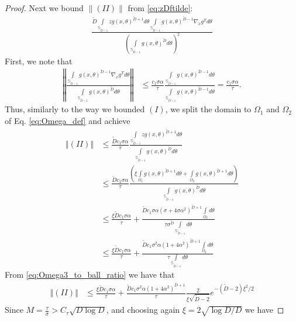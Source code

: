 \documentclass[12pt]{article}
\theoremstyle{remark}
\newcommand{\norm}[1]{\left\Vert #1 \right\Vert}
\newcommand{\wtilde}[1]{\widetilde{#1}}
\begin{document}
\begin{appendices}
\begin{proof}
Next we bound $\|(II)\|$ from \eqref{eq:zDftilde}:
\begin{align*}
\frac{\wtilde D\int\limits_{\mathbb{S}_{\wtilde D-1}}z g(x,\theta)^{\wtilde D+1} d\theta \int\limits_{\mathbb{S}_{\wtilde D-1}} g(x,\theta)^{\wtilde D-1}\nabla_x g^T d\theta}
{\left(\int\limits_{\mathbb{S}_{\wtilde D-1}}g(x,\theta)^{\wtilde D} d\theta\right)^2}
\end{align*}
First, we note that 
\begin{align*}
\norm{\frac{\int\limits_{\mathbb{S}_{\wtilde D-1}} g(x,\theta)^{\wtilde D-1}\nabla_x g^T d\theta}
{\int\limits_{\mathbb{S}_{\wtilde D-1}}g(x,\theta)^{\wtilde D} d\theta}} & \leq \frac{c_1 \sigma\alpha}{\tau} \frac{\int\limits_{\mathbb{S}_{\wtilde D-1}} g(x,\theta)^{\wtilde D-1} d\theta}
{\int\limits_{\mathbb{S}_{\wtilde D-1}}g(x,\theta)^{\wtilde D-1} d\theta} = \frac{c_1 \sigma \alpha}{\tau}.
\end{align*}
Thus, similarly to the way we bounded $(I)$, we split the domain to $\Omega_1$ and $\Omega_2$ of Eq. \eqref{eq:Omega_def} and achieve
\begin{align*}
\norm{(II)} &\leq \frac{\wtilde Dc_1 \sigma\alpha}{\tau}\frac{\int\limits_{\mathbb{S}_{\wtilde D-1}}z g(x,\theta)^{\wtilde D+1} d\theta}
{\int\limits_{\mathbb{S}_{\wtilde D-1}}g(x,\theta)^{\wtilde D} d\theta}
\\
&\leq \frac{\wtilde Dc_1 \sigma\alpha}{\tau} \frac{ \left(\xi\int\limits_{\Omega_1} g(x,\theta)^{\wtilde D+1}  d\theta + \int\limits_{\Omega_2} g(x,\theta)^{\wtilde D+1}  d\theta \right)}
{\int\limits_{\mathbb{S}_{\wtilde D-1}}g(x,\theta)^{\wtilde D} d\theta}
\\
&\leq  \frac{\xi\wtilde Dc_1 \sigma\alpha}{\tau} + \frac{\wtilde Dc_1 \sigma\alpha ( \sigma + 4\sigma \alpha^2)^{\wtilde D+1}\int\limits_{\Omega_2}  d\theta }
{\tau \sigma^{\wtilde D}\int\limits_{\mathbb{S}_{\wtilde D-1}} d\theta}
\\
&\leq  \frac{\xi\wtilde Dc_1 \sigma\alpha}{\tau} + \frac{\wtilde Dc_1 \sigma^2\alpha ( 1 + 4\alpha^2)^{\wtilde D+1}\int\limits_{\Omega_2}  d\theta }
{\tau \int\limits_{\mathbb{S}_{\wtilde D-1}} d\theta}
\end{align*}
From \eqref{eq:Omega3_to_ball_ratio} we have that 
\begin{align*}
\norm{(II)} &\leq  \frac{\xi\wtilde Dc_1 \sigma\alpha}{\tau} + \frac{\wtilde Dc_1 \sigma^2\alpha ( 1 + 4\alpha^2)^{\wtilde D+1}}
{\tau} \frac{2}{\xi\sqrt{\wtilde D-2}}e^{-(\wtilde D - 2 )\xi^2/2}
\end{align*}
Since $M = \frac{\tau}{\sigma}>C_\tau\sqrt{D\log D}$, and choosing again $\xi = 2\sqrt{\log D/D}$ we have


\end{proof}
\end{appendices}
\end{document}
